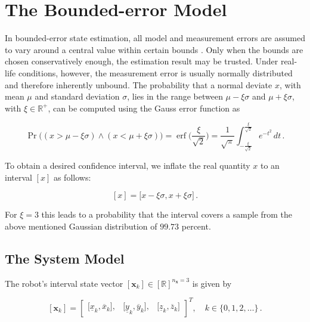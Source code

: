 \section{The Bounded-error Model}\label{sec: bounded_error}

In bounded-error state estimation, all model and measurement errors are assumed to vary around a central value within certain bounds \cite{Seignez2008ComplexitySO}. Only when the bounds are chosen conservatively enough, the estimation result may be trusted. Under real-life conditions, however, the measurement error is usually  normally distributed and therefore inherently unbound. The probability that a normal deviate $x$, with mean $\mu$ and standard deviation $\sigma$, lies in the range between $\mu - \xi \sigma$ and $\mu + \xi \sigma$, with $\xi \in \mathbb{R}^{+}$, can be computed using the Gauss error function as

\begin{equation} \label{eq:confidence}
 \operatorname{Pr}\big((x > \mu - \xi \sigma) \wedge (x < \mu + \xi \sigma)\big) = \operatorname{erf}\Bigg(\frac{\xi}{\sqrt{2}}\Bigg) = \frac{1}{\sqrt\pi}\int_{-\frac{\xi}{\sqrt{2}}}^{\frac{\xi}{\sqrt{2}}} e^{-t^2} \,dt \,.
\end{equation}

\noindent
To obtain a desired confidence interval, we inflate the real quantity $x$ to an interval $[x]$ as follows:

\begin{equation} \label{eq:state_vector_interval}
  [x] = [x - \xi \sigma,x + \xi \sigma\big] \,.
\end{equation}

\noindent
For $\xi = 3$ this leads to a probability that the interval covers a sample from the above mentioned Gaussian distribution of $99.73$ percent.

\subsection{The System Model}

The robot's interval state vector $[\bm{x}_k] \in [\mathbb{R}]^{n_{\bm{x}} = 3}$ is given by

\begin{equation} \label{eq:state_vector_interval}
  [\bm{x}_k] = \begin{bmatrix}
  	\big[\underline{x}_k, \overline{x}_k\big], & \big[\underline{y}_k, \overline{y}_k\big], & \big[\underline{z}_k, \overline{z}_k\big]
  \end{bmatrix}^T, \quad k \in \{0, 1, 2, \dots\}\,.
\end{equation}

